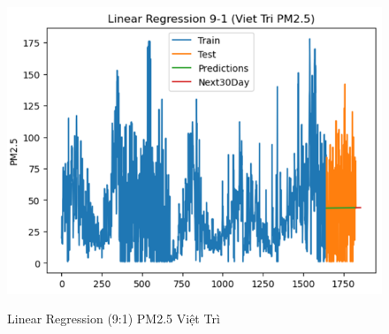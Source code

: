 \begin{figure}[h]
\begin{minipage}[b]{0.45\linewidth}
        \centering
        \includegraphics[width=\linewidth]{img/LN_9_1_VT.png}
        \caption{\scriptsize Linear Regression (9:1) PM2.5 Việt Trì}
        \label{fig1}
    \end{minipage}\hfill
    \begin{minipage}[b]{0.45\linewidth}
        \centering
        \label{fig2}
    \end{minipage}
\end{figure}